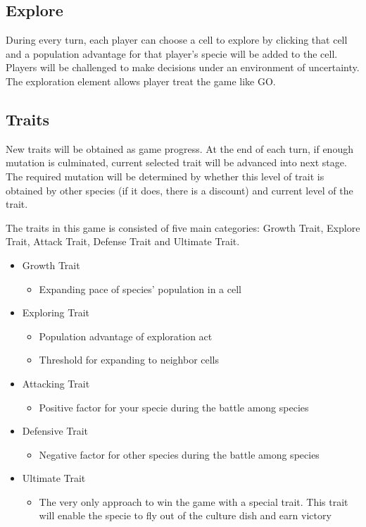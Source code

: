 \documentclass[12pt,a4paper,twoside]{scrartcl}
\begin{document}
\subsection{Explore}

During every turn, each player can choose a cell to explore by clicking that cell and a population advantage for that player's specie will be added to the cell. Players will be challenged to make decisions under an environment of uncertainty. The exploration element allows player treat the game like GO.

\subsection{Traits}

New traits will be obtained as game progress. At the end of each turn, if enough mutation is culminated, current selected trait will be advanced into next stage. The required mutation will be determined by whether this level of trait is obtained by other species (if it does, there is a discount) and current level of the trait. 

The traits in this game is consisted of five main categories: Growth Trait, Explore Trait, Attack Trait, Defense Trait and Ultimate Trait.


\begin{itemize}
	\item Growth Trait
	\begin{itemize}
		\item Expanding pace of species' population in a cell
	\end{itemize}
	\item Exploring Trait
	\begin{itemize}
		\item Population advantage of exploration act
		\item Threshold for expanding to neighbor cells
	\end{itemize}
	\item Attacking Trait
	\begin{itemize}
		\item Positive factor for your specie during the battle among species
	\end{itemize}
	\item Defensive Trait
	\begin{itemize}
		\item Negative factor for other species during the battle among species
	\end{itemize}
	\item Ultimate Trait
	\begin{itemize}
		\item The very only approach to win the game with a special trait. This trait will enable the specie to fly out of the culture dish and earn victory
	\end{itemize}
\end{itemize}
\end{document}
